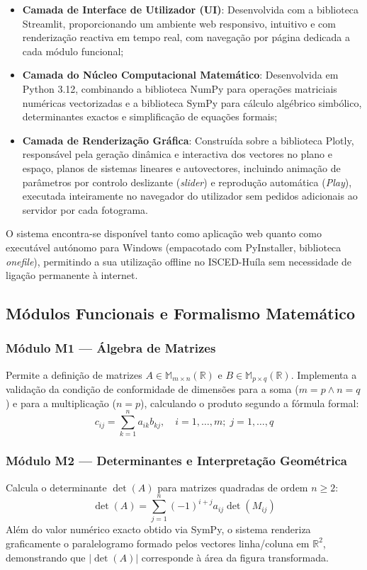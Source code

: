 \documentclass[conference]{IEEEtran}
\begin{document}
\begin{itemize}
  \item \textbf{Camada de Interface de Utilizador (UI)}: Desenvolvida com a biblioteca Streamlit, proporcionando um ambiente web responsivo, intuitivo e com renderização reactiva em tempo real, com navegação por página dedicada a cada módulo funcional;
  \item \textbf{Camada do Núcleo Computacional Matemático}: Desenvolvida em Python 3.12, combinando a biblioteca NumPy para operações matriciais numéricas vectorizadas e a biblioteca SymPy para cálculo algébrico simbólico, determinantes exactos e simplificação de equações formais;
  \item \textbf{Camada de Renderização Gráfica}: Construída sobre a biblioteca Plotly, responsável pela geração dinâmica e interactiva dos vectores no plano e espaço, planos de sistemas lineares e autovectores, incluindo animação de parâmetros por controlo deslizante (\textit{slider}) e reprodução automática (\textit{Play}), executada inteiramente no navegador do utilizador sem pedidos adicionais ao servidor por cada fotograma.
\end{itemize}

O sistema encontra-se disponível tanto como aplicação web quanto como executável autónomo para Windows (empacotado com PyInstaller, biblioteca \textit{onefile}), permitindo a sua utilização offline no ISCED-Huíla sem necessidade de ligação permanente à internet.

\subsection{Módulos Funcionais e Formalismo Matemático}

\subsubsection{Módulo M1 --- Álgebra de Matrizes}
Permite a definição de matrizes $A \in \mathbb{M}_{m \times n}(\mathbb{R})$ e $B \in \mathbb{M}_{p \times q}(\mathbb{R})$. Implementa a validação da condição de conformidade de dimensões para a soma ($m=p \wedge n=q$) e para a multiplicação ($n=p$), calculando o produto segundo a fórmula formal:
\begin{equation}
c_{ij} = \sum_{k=1}^{n} a_{ik}b_{kj}, \quad i = 1,\dots,m;\; j = 1,\dots,q
\label{eq:produto}
\end{equation}

\subsubsection{Módulo M2 --- Determinantes e Interpretação Geométrica}
Calcula o determinante $\det(A)$ para matrizes quadradas de ordem $n \geq 2$:
\begin{equation}
\det(A) = \sum_{j=1}^{n} (-1)^{i+j} a_{ij} \det(M_{ij})
\label{eq:determinante}
\end{equation}
Além do valor numérico exacto obtido via SymPy, o sistema renderiza graficamente o paralelogramo formado pelos vectores linha/coluna em $\mathbb{R}^2$, demonstrando que $|\det(A)|$ corresponde à área da figura transformada.
\end{document}
